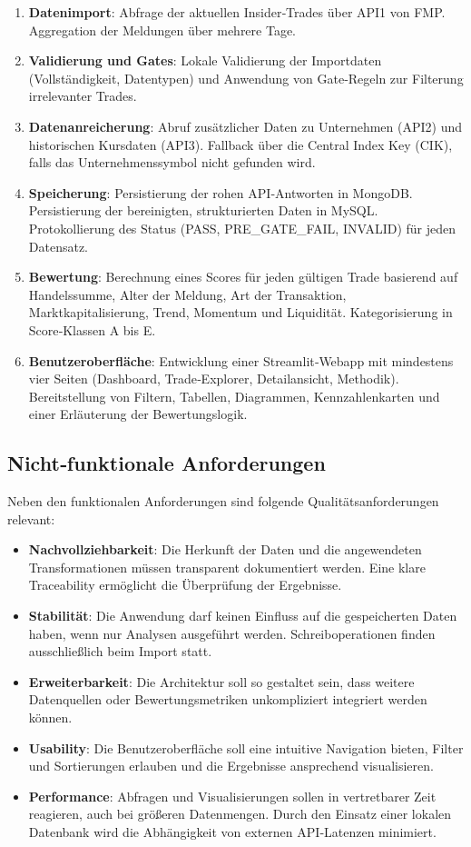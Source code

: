 \begin{enumerate}[label=F\arabic*.,wide=0pt, leftmargin=1.2cm]
  \item \textbf{Datenimport}: Abfrage der aktuellen Insider‑Trades über API1 von FMP. Aggregation der Meldungen über mehrere Tage.
  \item \textbf{Validierung und Gates}: Lokale Validierung der Importdaten (Vollständigkeit, Datentypen) und Anwendung von Gate‑Regeln zur Filterung irrelevanter Trades.
  \item \textbf{Datenanreicherung}: Abruf zusätzlicher Daten zu Unternehmen (API2) und historischen Kursdaten (API3). Fallback über die Central Index Key (CIK), falls das Unternehmenssymbol nicht gefunden wird.
  \item \textbf{Speicherung}: Persistierung der rohen API‑Antworten in MongoDB. Persistierung der bereinigten, strukturierten Daten in MySQL. Protokollierung des Status (PASS, PRE\_GATE\_FAIL, INVALID) für jeden Datensatz.
  \item \textbf{Bewertung}: Berechnung eines Scores für jeden gültigen Trade basierend auf Handelssumme, Alter der Meldung, Art der Transaktion, Marktkapitalisierung, Trend, Momentum und Liquidität. Kategorisierung in Score‑Klassen A bis E.
  \item \textbf{Benutzeroberfläche}: Entwicklung einer Streamlit‑Webapp mit mindestens vier Seiten (Dashboard, Trade‑Explorer, Detailansicht, Methodik). Bereitstellung von Filtern, Tabellen, Diagrammen, Kennzahlenkarten und einer Erläuterung der Bewertungslogik.
\end{enumerate}

\subsection{Nicht‑funktionale Anforderungen}

Neben den funktionalen Anforderungen sind folgende Qualitätsanforderungen relevant:

\begin{itemize}[leftmargin=1.2cm]
  \item \textbf{Nachvollziehbarkeit}: Die Herkunft der Daten und die angewendeten Transformationen müssen transparent dokumentiert werden. Eine klare Traceability ermöglicht die Überprüfung der Ergebnisse.
  \item \textbf{Stabilität}: Die Anwendung darf keinen Einfluss auf die gespeicherten Daten haben, wenn nur Analysen ausgeführt werden. Schreiboperationen finden ausschließlich beim Import statt.
  \item \textbf{Erweiterbarkeit}: Die Architektur soll so gestaltet sein, dass weitere Datenquellen oder Bewertungsmetriken unkompliziert integriert werden können.
  \item \textbf{Usability}: Die Benutzeroberfläche soll eine intuitive Navigation bieten, Filter und Sortierungen erlauben und die Ergebnisse ansprechend visualisieren.
  \item \textbf{Performance}: Abfragen und Visualisierungen sollen in vertretbarer Zeit reagieren, auch bei größeren Datenmengen. Durch den Einsatz einer lokalen Datenbank wird die Abhängigkeit von externen API‑Latenzen minimiert.
\end{itemize}


